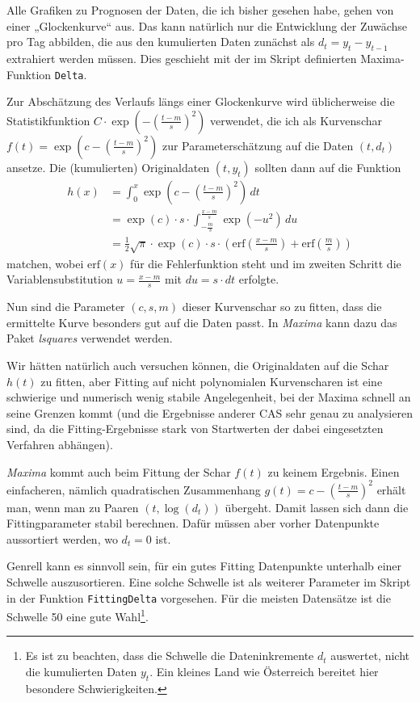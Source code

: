 \documentclass[a4paper,11pt]{article}
\newcommand{\br}[1]{\left(#1\right)}
\newcommand{\erf}{\mathrm{erf}}
\newcommand{\m}{\cdot}
\begin{document}
Alle Grafiken zu Prognosen der Daten, die ich bisher gesehen habe, gehen von
einer „Glockenkurve“ aus.  Das kann natürlich nur die Entwicklung der Zuwächse
pro Tag abbilden, die aus den kumulierten Daten zunächst als $d_t=y_t-y_{t-1}$
extrahiert werden müssen. Dies geschieht mit der im Skript definierten
Maxima-Funktion \texttt{Delta}.

Zur Abschätzung des Verlaufs längs einer Glockenkurve wird üblicherweise die
Statistikfunktion $C\m\exp\br{-\br{\frac{t-m}{s}}^2}$ verwendet, die ich als
Kurvenschar $f(t)=\exp\br{c-\br{\frac{t-m}{s}}^2}$ zur Parameterschätzung auf
die Daten $(t,d_t)$ ansetze.  Die (kumulierten) Originaldaten $(t,y_t)$
sollten dann auf die Funktion
\begin{align*}
  h(x)&=\int_0^x{\exp\br{c-\br{\frac{t-m}{s}}^2}}\,dt\\ &=\exp(c)\m s\m
  \int_{-\frac{m}{s}}^{\frac{x-m}{s}}{\exp\br{-u^2}}\,du\\ &=\frac12 \sqrt{\pi}\m
  \exp(c)\m s\m \br{\erf\br{\frac{x-m}{s}}+ \erf\br{\frac{m}{s}}}
\end{align*}
matchen, wobei $\erf(x)$ für die Fehlerfunktion steht und im zweiten Schritt
die Variablensubstitution $u=\frac{x-m}{s}$ mit $du=s\m dt$ erfolgte.

Nun sind die Parameter $(c,s,m)$ dieser Kurvenschar so zu fitten, dass die
ermittelte Kurve besonders gut auf die Daten passt.  In \emph{Maxima} kann
dazu das Paket \emph{lsquares} verwendet werden.  

Wir hätten natürlich auch versuchen können, die Originaldaten auf die Schar
$h(t)$ zu fitten, aber Fitting auf nicht polynomialen Kurvenscharen ist eine
schwierige und numerisch wenig stabile Angelegenheit, bei der Maxima schnell
an seine Grenzen kommt (und die Ergebnisse anderer CAS sehr genau zu
analysieren sind, da die Fitting-Ergebnisse stark von Startwerten der dabei
eingesetzten Verfahren abhängen).

\emph{Maxima} kommt auch beim Fittung der Schar $f(t)$ zu keinem Ergebnis.
Einen einfacheren, nämlich quadratischen Zusammenhang
$g(t)=c-\br{\frac{t-m}{s}}^2$ erhält man, wenn man zu Paaren $(t,\log(d_t))$
übergeht.  Damit lassen sich dann die Fittingparameter stabil berechnen. Dafür
müssen aber vorher Datenpunkte aussortiert werden, wo $d_t=0$ ist.

Genrell kann es sinnvoll sein, für ein gutes Fitting Datenpunkte unterhalb
einer Schwelle auszusortieren. Eine solche Schwelle ist als weiterer Parameter
im Skript in der Funktion \texttt{FittingDelta} vorgesehen. Für die meisten
Datensätze ist die Schwelle 50 eine gute Wahl\footnote{Es ist zu beachten,
  dass die Schwelle die Dateninkremente $d_t$ auswertet, nicht die kumulierten
  Daten $y_t$.  Ein kleines Land wie Österreich bereitet hier besondere
  Schwierigkeiten.}.
\end{document}
